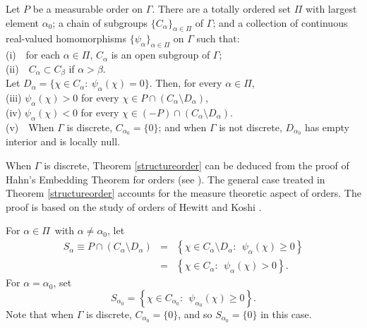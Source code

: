 \documentclass[12pt,leqno]{article}
\begin{document}
\begin{thm}
Let $P$ be a measurable order on $\Gamma$.  There 
are a totally ordered set $\Pi$ with largest element 
$\alpha_0$; a chain of subgroups $\{C_\alpha\}_{\alpha\in\Pi}$
of $\Gamma$; 
and a collection of continuous real-valued homomorphisms 
$\{\psi_\alpha\}_{\alpha\in\Pi}$ on $\Gamma$ such that:\\
(i)\ \ for each $\alpha\in\Pi$, $C_\alpha$ is an 
open subgroup of $\Gamma$;\\
(ii)\ \ $C_\alpha\subset C_\beta$ if $\alpha > \beta$.\\ 
Let $D_\alpha=\{\chi\in C_\alpha:\ \psi_\alpha(\chi)=0\}$.  Then,
 for every $\alpha\in \Pi$,\\
(iii) $\psi_\alpha(\chi)>0$ for every 
	$\chi\in P\cap (C_\alpha\setminus D_\alpha)$,\\
(iv)    $\psi_\alpha(\chi)<0$ for every $\chi\in 
	(-P)\cap (C_\alpha\setminus D_\alpha).$\\
(v)\ \ When $\Gamma$ is discrete, $C_{\alpha_0}=\{0\}$; and 
when $\Gamma$ is not discrete, $D_{\alpha_0}$ 
has empty interior and is locally null.
\label{structureorder}
\end{thm}

When $\Gamma$ is discrete, Theorem \ref{structureorder} 
can be deduced from
the proof of Hahn's Embedding Theorem for
orders (see \cite[Theorem 16, p.59]{fu}). 
The general case treated in Theorem \ref{structureorder}
accounts for the measure theoretic aspect of orders.
The proof is
based on the study of orders of Hewitt and Koshi \cite{hk}.

For $\alpha\in \Pi$\ with $\alpha\neq\alpha_0$, let
\begin{eqnarray}
S_\alpha\equiv P\cap (C_\alpha \setminus D_\alpha)
&=& \left\{
\chi\in C_\alpha\setminus D_\alpha:\ \ \psi_\alpha(\chi)\geq 0\right\}
\label{alphaslice}\\
&=&\left\{
\chi\in C_\alpha :\ \ \psi_\alpha(\chi)> 0\right\}.
\label{alphaslice2}
\end{eqnarray}
For $\alpha=\alpha_0$, set
\begin{equation}
S_{\alpha_0}=\left\{
\chi\in C_{\alpha_0}:\ \ \psi_{\alpha_0}(\chi)\geq 0\right\}.
\label{alpha0slice}
\end{equation}
Note that when $\Gamma$ is discrete, $C_{\alpha_0}=\{0\}$, and so $S_{\alpha_0}=\{0\}$ in this case. 
\end{document}
